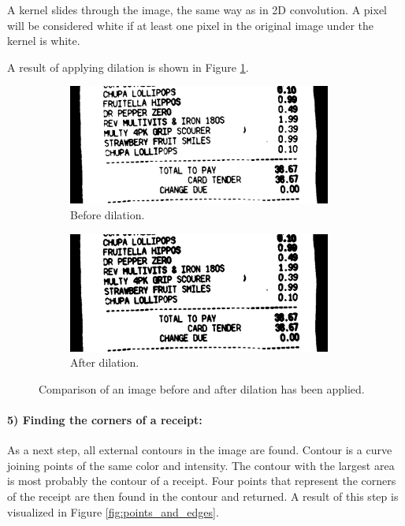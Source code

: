 \documentclass[
  digital, %
  table,   %
  oneside, %
  lof,     %
  lot,     %
]{fithesis3}
\newcommand\half{0.45}
\newcommand\subfigsize{0.95}
\begin{document}
A kernel slides through the image, the same way as in 2D convolution. A pixel will be considered white if at least one pixel in the original image under the kernel is white.

A result of applying dilation is shown in Figure \ref{fig:dilation}.

\begin{figure}
    \centering
    \begin{subfigure}[t]{\half\textwidth}
      \centering
      \includegraphics[width=\subfigsize\textwidth]{figures/image_processing/before_dilation}
      \caption{Before dilation.}
    \end{subfigure}
    \begin{subfigure}[t]{\half\textwidth}
      \centering
      \includegraphics[width=\subfigsize\textwidth]{figures/image_processing/after_dilation}
      \caption{After dilation.}
    \end{subfigure}
    \caption{Comparison of an image before and after dilation has been applied.}
    \label{fig:dilation}
\end{figure}

\paragraph{5) Finding the corners of a receipt:} As a next step, all external contours in the image are found. Contour is a curve joining points of the same color and intensity. The contour with the largest area is most probably the contour of a receipt. Four points that represent the corners of the receipt are then found in the contour and returned. A result of this step is visualized in Figure \ref{fig:points_and_edges}.
\end{document}
